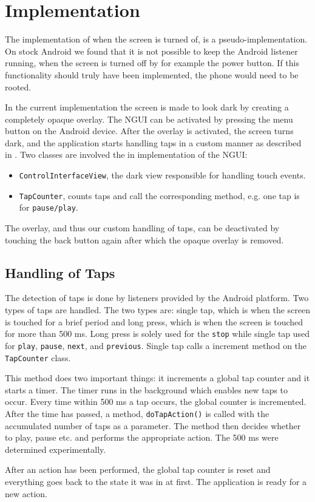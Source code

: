 \section{Implementation}
The implementation of when the screen is turned of, is a pseudo-implementation. On stock Android we found that it is not possible to keep the Android listener running, when the screen is turned off by for example the power button. If this functionality should truly have been implemented, the phone would need to be rooted. 

In the current implementation the screen is made to look dark by creating a completely opaque overlay. The NGUI can be activated by pressing the menu button on the Android device. After the overlay is activated, the screen turns dark, and the application starts handling taps in a custom manner as described in . Two classes are involved the in implementation of the NGUI: 
\begin{itemize}
\item \texttt{ControlInterfaceView}, the dark view responsible for handling touch events.
\item \texttt{TapCounter}, counts taps and call the corresponding method, e.g. one tap is for \texttt{pause/play}.
\end{itemize}


The overlay, and thus our custom handling of taps, can be deactivated by touching the back button again after which the opaque overlay is removed.

\subsection{Handling of Taps}\label{subsec:handleTaps}
The detection of taps is done by listeners provided by the Android platform. Two types of taps are handled. The two types are: single tap, which is when the screen is touched for a brief period and long press, which is when the screen is touched for more than 500 ms. Long press is solely used for the \texttt{stop} while single tap used for \texttt{play}, \texttt{pause}, \texttt{next}, and \texttt{previous}. Single tap calls a increment method on the \texttt{TapCounter} class.

This method does two important things: it increments a global tap counter and it starts a timer. The timer runs in the background which enables new taps to occur. Every time within 500 ms a tap occurs, the global counter is incremented. After the time has passed, a method, \texttt{doTapAction()} is called with the accumulated number of taps as a parameter. The method then decides whether to play, pause etc. and performs the appropriate action. The 500 ms were determined experimentally.

After an action has been performed, the global tap counter is reset and everything goes back to the state it was in at first. The application is ready for a new action.